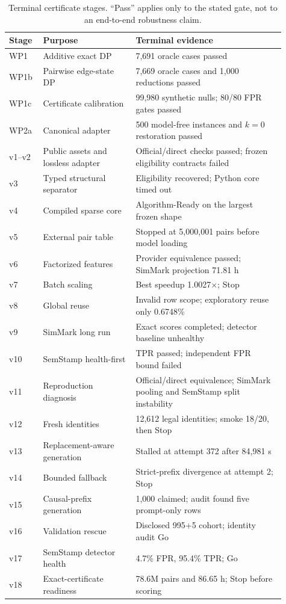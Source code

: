 \documentclass[10pt]{article}
\begin{document}
\begin{table}[h]
\caption{Terminal certificate stages. ``Pass'' applies only to the stated
gate, not to an end-to-end robustness claim.}
\label{tab:timeline}
\centering
\scriptsize
\begin{tabular}{p{0.10\linewidth}p{0.31\linewidth}p{0.50\linewidth}}
\toprule
Stage & Purpose & Terminal evidence \\
\midrule
WP1 & Additive exact DP & 7,691 oracle cases passed \\
WP1b & Pairwise edge-state DP & 7,669 oracle cases and 1,000 reductions passed \\
WP1c & Certificate calibration & 99,980 synthetic nulls; 80/80 FPR gates passed \\
WP2a & Canonical adapter & 500 model-free instances and $k=0$ restoration passed \\
v1--v2 & Public assets and lossless adapter &
Official/direct checks passed; frozen eligibility contracts failed \\
v3 & Typed structural separator & Eligibility recovered; Python core timed out \\
v4 & Compiled sparse core & Algorithm-Ready on the largest frozen shape \\
v5 & External pair table & Stopped at 5,000,001 pairs before model loading \\
v6 & Factorized features & Provider equivalence passed; SimMark projection 71.81 h \\
v7 & Batch scaling & Best speedup 1.0027$\times$; Stop \\
v8 & Global reuse & Invalid row scope; exploratory reuse only 0.6748\% \\
v9 & SimMark long run & Exact scores completed; detector baseline unhealthy \\
v10 & SemStamp health-first & TPR passed; independent FPR bound failed \\
v11 & Reproduction diagnosis &
Official/direct equivalence; SimMark pooling and SemStamp split instability \\
v12 & Fresh identities & 12,612 legal identities; smoke 18/20, then Stop \\
v13 & Replacement-aware generation & Stalled at attempt 372 after 84,981 s \\
v14 & Bounded fallback & Strict-prefix divergence at attempt 2; Stop \\
v15 & Causal-prefix generation & 1,000 claimed; audit found five prompt-only rows \\
v16 & Validation rescue & Disclosed 995+5 cohort; identity audit Go \\
v17 & SemStamp detector health & 4.7\% FPR, 95.4\% TPR; Go \\
v18 & Exact-certificate readiness & 78.6M pairs and 86.65 h; Stop before scoring \\
\bottomrule
\end{tabular}
\end{table}
\end{document}
